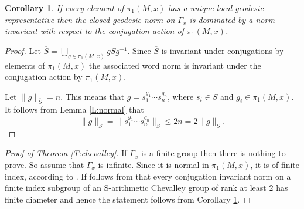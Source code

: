 \documentclass[12pt]{amsart}
\newtheorem{corollary}[subsection]{Corollary}
\theoremstyle{definition}
\theoremstyle{remark}
\numberwithin{figure}{section}
\numberwithin{table}{section}
\numberwithin{equation}{section}
\begin{document}
\begin{corollary}\label{C:domination}
If every element of $\pi_1(M,x)$ has a unique local geodesic representative then 
the closed geodesic norm on $\Gamma_x$ is dominated by a norm invariant
with respect to the conjugation action of $\pi_1(M,x)$.
\end{corollary}

\begin{proof}
Let $\overline{S} = \bigcup_{g\in \pi_1(M,x)} g S g^{-1}$. Since $\overline{S}$ is
invariant under conjugations by elements of $\pi_1(M,x)$ the associated
word norm is invariant under the conjugation action by $\pi_1(M,x)$.

Let $\|g\|_{\overline{S}}=n$. This means that $g=s_1^{g_{1}}\cdots s_n^{g_{n}}$,
where $s_i\in S$ and $g_i\in \pi_1(M,x)$.
It follows from Lemma \ref{L:normal} that
$$
\|g\|_S = \|s_1^{g_{1}}\cdots s_n^{g_{n}}\|_S \leq 2 n = 2\|g\|_{\overline{S}}.
$$
\end{proof}



\begin{proof}[Proof of Theorem \ref{T:chevalley}]
If $\Gamma_x$ is a finite group then there is nothing to prove. So assume that
$\Gamma_x$ is infinite. Since it is normal in $\pi_1(M,x)$, it is of finite 
index, according to \cite[(5.3) Proposition, p.324]{MR1090825}. 
If follows from \cite{MR2819193,MR2819193-add}
that every conjugation invariant norm on a finite index subgroup of an
S-arithmetic Chevalley group of rank at least $2$ has finite diameter
and hence the statement follows from Corollary \ref{C:domination}.
\end{proof}
\end{document}
